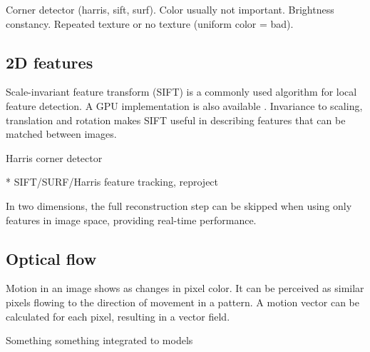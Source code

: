 
Corner detector (harris, sift, surf). Color usually not important. Brightness constancy. Repeated texture or no texture (uniform color = bad).

\subsection{2D features}

Scale-invariant feature transform (SIFT) \cite{lowe1999object} is a commonly used algorithm for local feature detection. A GPU implementation is also available \cite{changchang2007siftgpu}.  Invariance to scaling, translation and rotation makes SIFT useful in describing features that can be matched between images.

Harris corner detector 

* SIFT/SURF/Harris feature tracking, reproject

In two dimensions, the full reconstruction step can be skipped when using only features in image space, providing real-time performance. \cite{pilet2005real}


\subsection{Optical flow}

Motion in an image shows as changes in pixel color.
It can be perceived as similar pixels flowing to the direction of movement in a pattern.
A motion vector can be calculated for each pixel, resulting in a vector field.
\cite{gibson1950perception,horn1981determining,beauchemin1995computation}

Something something integrated to models
\cite{decarlo1996integration}
